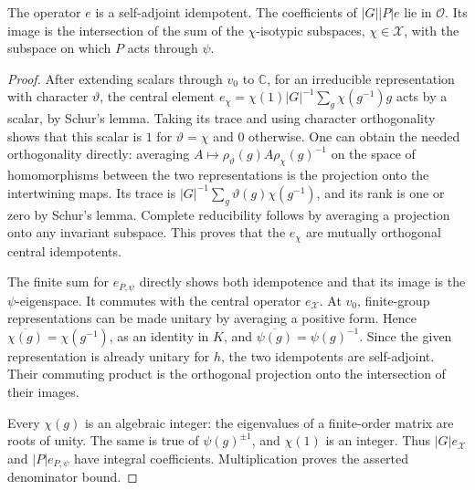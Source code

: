 \begin{lemma}\label{div:projectors}
The operator $e$ is a self-adjoint idempotent. The coefficients of
$|G||P|e$ lie in $\mathcal O$. Its image is the intersection of the
sum of the $\chi$-isotypic subspaces, $\chi\in\mathcal X$, with the
subspace on which $P$ acts through $\psi$.
\end{lemma}
\begin{proof}
After extending scalars through $v_0$ to $\mathbb C$, for an irreducible
representation with character $\vartheta$,
the central element
$e_\chi=\chi(1)|G|^{-1}\sum_g\chi(g^{-1})g$ acts by a scalar,
by Schur's lemma. Taking its trace and using character orthogonality
shows that this scalar is $1$ for $\vartheta=\chi$ and $0$ otherwise.
One can obtain the needed orthogonality directly: averaging
$A\mapsto\rho_\vartheta(g)A\rho_\chi(g)^{-1}$ on the space of
homomorphisms between the two representations
is the projection onto the intertwining maps. Its trace is
$|G|^{-1}\sum_g\vartheta(g)\chi(g^{-1})$, and its rank is one or
zero by Schur's lemma. Complete reducibility follows by averaging a
projection onto any invariant subspace. This proves that the $e_\chi$
are mutually orthogonal central idempotents.

The finite sum for $e_{P,\psi}$ directly shows both idempotence and
that its image is the $\psi$-eigenspace. It commutes with the central
operator $e_{\mathcal X}$. At $v_0$, finite-group representations can
be made unitary by averaging a positive form. Hence
$\overline{\chi(g)}=\chi(g^{-1})$, as an identity in $K$, and
$\overline{\psi(g)}=\psi(g)^{-1}$. Since the given representation
is already unitary for $h$, the two idempotents are self-adjoint.
Their commuting product is the orthogonal projection onto the
intersection of their images.

Every $\chi(g)$ is an algebraic integer: the eigenvalues of a
finite-order matrix are roots of unity. The same is true of
$\psi(g)^{\pm1}$, and $\chi(1)$ is an integer.
Thus $|G|e_{\mathcal X}$ and $|P|e_{P,\psi}$ have integral
coefficients. Multiplication proves the asserted denominator bound.
\end{proof}

